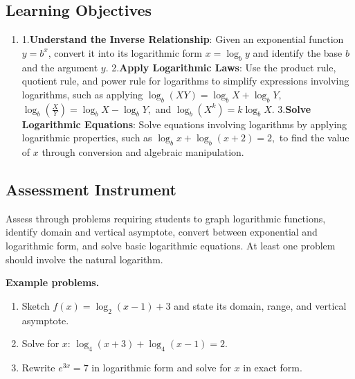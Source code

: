 \subsection{Learning Objectives}
\label{ssec:lear-1bc3}

\begin{enumerate}
    \item 1.\textbf{Understand the Inverse Relationship}: Given an exponential function $y = b^x$, convert it into its logarithmic form $x = \log_b y$ and identify the base $b$ and the argument $y$. 2.\textbf{Apply Logarithmic Laws}: Use the product rule, quotient rule, and power rule for logarithms to simplify expressions involving logarithms, such as applying $ \log_b (XY) = \log_b X + \log_b Y, $ $ \log_b \left(\frac{X}{Y}\right) = \log_b X - \log_b Y, $ and $ \log_b (X^k) = k \log_b X. $ 3.\textbf{Solve Logarithmic Equations}: Solve equations involving logarithms by applying logarithmic properties, such as $ \log_b x + \log_b (x + 2) = 2, $ to find the value of $x$ through conversion and algebraic manipulation.
\end{enumerate}

\subsection{Assessment Instrument}
\label{ssec:asse-ebc6}

Assess through problems requiring students to graph logarithmic functions, identify domain
and vertical asymptote, convert between exponential and logarithmic form, and solve basic
logarithmic equations. At least one problem should involve the natural logarithm.

\textbf{Example problems.}

\begin{enumerate}
    \item Sketch $f(x) = \log_2(x - 1) + 3$ and state its domain, range, and vertical asymptote.
    \item Solve for $x$: $\log_4(x + 3) + \log_4(x - 1) = 2$.
    \item Rewrite $e^{3x} = 7$ in logarithmic form and solve for $x$ in exact form.
\end{enumerate}

